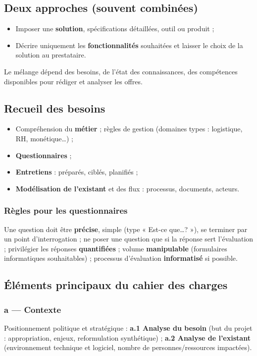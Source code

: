 \documentclass[11pt,a4paper]{article}
\begin{document}
\subsection{Deux approches (souvent combinées)}
\begin{itemize}[nosep]
  \item Imposer une \textbf{solution}, spécifications détaillées, outil ou produit ;
  \item Décrire uniquement les \textbf{fonctionnalités} souhaitées et laisser le choix de la solution au prestataire.
\end{itemize}
Le mélange dépend des besoins, de l'état des connaissances, des compétences disponibles pour rédiger et analyser les offres.

\subsection{Recueil des besoins}
\begin{itemize}[nosep]
  \item Compréhension du \textbf{métier} ; règles de gestion (domaines types : logistique, RH, monétique\ldots) ;
  \item \textbf{Questionnaires} ;
  \item \textbf{Entretiens} : préparés, ciblés, planifiés ;
  \item \textbf{Modélisation de l'existant} et des flux : processus, documents, acteurs.
\end{itemize}

\subsubsection{Règles pour les questionnaires}
Une question doit être \textbf{précise}, simple (type « Est-ce que\ldots ? »), se terminer par un point d'interrogation ; ne poser une question que si la réponse sert l'évaluation ; privilégier les réponses \textbf{quantifiées} ; volume \textbf{manipulable} (formulaires informatiques souhaitables) ; processus d'évaluation \textbf{informatisé} si possible.

\subsection{Éléments principaux du cahier des charges}

\subsubsection{a — Contexte}
Positionnement politique et stratégique : \textbf{a.1 Analyse du besoin} (but du projet : appropriation, enjeux, reformulation synthétique) ; \textbf{a.2 Analyse de l'existant} (environnement technique et logiciel, nombre de personnes/ressources impactées).
\end{document}
